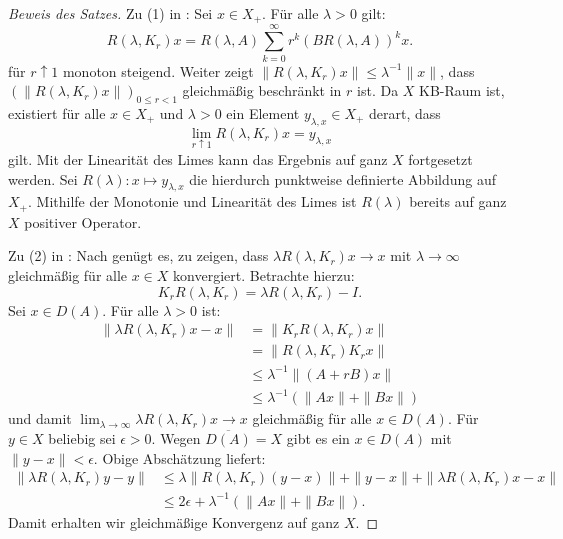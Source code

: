 \begin{proof}[Beweis des Satzes]
\par
Zu (1) in : Sei $x\in X_+$. Für alle  $\lambda >0$ gilt:
\begin{equation*}
R(\lambda, K_r)x=R(\lambda, A)\sum_{k=0}^\infty r^k (BR(\lambda, A))^kx.
\end{equation*}
für $r\uparrow 1$ monoton steigend. Weiter zeigt $\|R(\lambda, K_r)x\|\leq \lambda^{-1}\|x\|$, dass $(\|R(\lambda, K_r)x\|)_{0\leq r<1}$ gleichmäßig beschränkt in $r$ ist. Da $X$ KB-Raum ist, existiert für alle $x\in X_+$ und $\lambda >0$ ein Element $y_{\lambda, x}\in X_+$ derart, dass
\begin{equation}\label{Grenzwert der Resolventen}
\lim_{r\uparrow 1}R(\lambda, K_r)x = y_{\lambda, x}
\end{equation}
gilt. Mit der Linearität des Limes kann das Ergebnis auf ganz $X$ fortgesetzt werden. Sei $R(\lambda)\colon x\mapsto y_{\lambda,x}$ die hierdurch punktweise definierte Abbildung auf $X_+$. Mithilfe der Monotonie und Linearität des Limes ist $R(\lambda)$ bereits auf ganz $X$ positiver Operator.

\par
Zu (2) in : Nach  genügt es, zu zeigen, dass $\lambda R(\lambda, K_r)x\to x$ mit $\lambda\to\infty$ gleichmäßig für alle $x\in X$ konvergiert. Betrachte hierzu:
\begin{equation*}
K_r R(\lambda, K_r)=\lambda R(\lambda, K_r)-I.
\end{equation*}
Sei $x\in D(A)$. Für alle $\lambda>0$ ist:
\begin{align*}
\|\lambda R(\lambda, K_r)x -x\|
&=\|K_r R(\lambda, K_r)x\|\\
&=\|R(\lambda, K_r)K_rx\|\\
&\leq \lambda^{-1}\|(A+rB)x\|\\
&\leq \lambda^{-1}(\|Ax\| + \|Bx\|)
\end{align*}
und damit   $\lim_{\lambda\to\infty}\lambda R(\lambda, K_r)x \to x$ gleichmäßig für alle $x\in D(A)$. Für $y\in X$ beliebig  sei $\epsilon >0$. Wegen $\overline{D(A)}= X$ gibt es ein $x\in D(A)$ mit $\|y - x\|< \epsilon$. Obige Abschätzung liefert:
\begin{align*}
\|\lambda R(\lambda, K_r)y - y\|
&\leq \lambda \|R(\lambda, K_r)(y-x)\| + \|y-x\| + \|\lambda R(\lambda, K_r)x -x\|\\
&\leq 2\epsilon + \lambda^{-1}(\|Ax\| + \|Bx\|).
\end{align*}
Damit erhalten wir gleichmäßige Konvergenz auf ganz $X$.


\end{proof}

